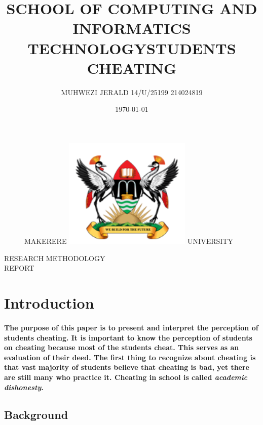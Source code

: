 \documentclass[11pt]{article}
\begin{document}
		
\title{SCHOOL OF COMPUTING AND INFORMATICS\\ TECHNOLOGY}
\author{MUHWEZI JERALD 14/U/25199 214024819}
\date{\today{}}
\begin{figure}
	\begin{center}
	\Huge MAKERERE \includegraphics[width=172pt]{muk.png} \Huge UNIVERSITY
	\end{center}
\end{figure}
	\maketitle
	
	\begin{center}
	RESEARCH METHODOLOGY \\REPORT
	\end{center}
	
	\newpage
	\begin{center}
	\title{STUDENTS CHEATING}
	\end{center}
	
	\tableofcontents
	
	\section{Introduction}
	 \paragraph{The purpose of this paper is to present and
	  interpret the perception of students cheating. It is important to know the perception of students on cheating because most of the students cheat. This serves as an evaluation of their deed. The first thing to recognize about cheating is that vast majority of students believe that cheating is bad, yet there are still many who practice it. Cheating in school is called \emph{academic dishonesty}.}
	 
	 \subsection{Background}
\end{document}
